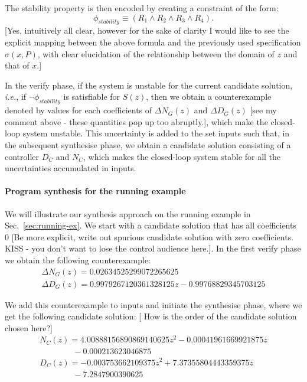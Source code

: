 \documentclass{sig-alternate-05-2015}
\newcommand{\red}[1]{{\color{red}#1}}
\begin{document}
The stability property is then encoded by creating a
constraint of the form:
$$
\phi_{stability} \equiv (R_1 \wedge R_2 \wedge R_3 \wedge R_4).
$$
\red{[Yes, intuitively all clear, however for the sake of clarity I would like to see the explicit mapping between the above formula and the previously used specification 
$\sigma(x, P)$, with clear elucidation of the relationship between the domain of $z$ and that of $x$.]}

In the {\sc verify} phase, if the system is unstable for the current candidate solution,
{\it i.e.}, if $\neg \phi_{stability}$ is satisfiable for $S(z)$, 
then we obtain a counterexample denoted by 
values for each coefficients of $\Delta N_{G}(z)$ and $\Delta D_{G}(z)$ \red{[see my comment above - these quantities pop up too abruptly.]},
which make the closed-loop system unstable. This uncertainty is added to 
the set {\sc inputs} such that, in the subsequent {\sc synthesise} phase, 
we obtain a candidate solution consisting 
of a controller $D_C$ and $N_C$, which makes the closed-loop 
system stable for all the uncertainties accumulated in {\sc inputs}.

\paragraph{Program synthesis for the running example}
We will illustrate our synthesis approach on the running example 
in Sec.~\ref{sec:running-ex}.
We start with a candidate solution that has all coefficients 0 \red{[Be more explicit, write out spurious candidate solution with zero coefficients. KISS - you don't want to lose the control audience here.]}.
In the first {\sc verify} phase we obtain the following counterexample:
$$
\begin{array}{ll}
\Delta N_G(z) = 0.02634525299072265625\\
\Delta D_G(z) = 0.9979267120361328125z-0.99768829345703125
\end{array}
$$

We add this counterexample to {\sc inputs} and initiate the {\sc synthesise} phase, where we get the following candidate solution: 
\red{[ How is the order of the candidate solution chosen here?]}
$$
\begin{array}{ll}
N_C(z) {=} 4.00888156890869140625z^2{-}0.00041961669921875z\\
\qquad\qquad -0.000213623046875\\
D_C(z) {=} -0.003753662109375z^2{+}7.37355804443359375z \\
\qquad\qquad -7.2847900390625\\
\end{array}
$$
\end{document}
